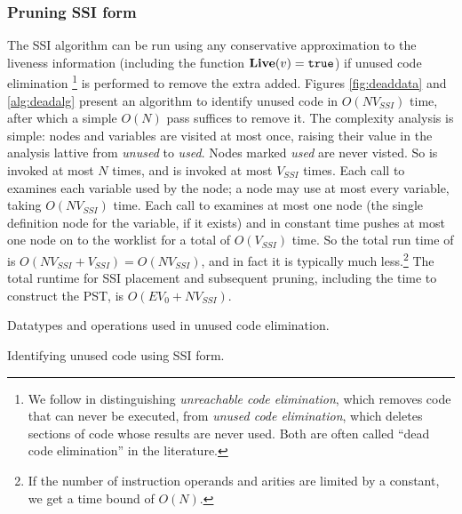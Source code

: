 \documentclass[12pt,titlepage,twoside]{article}
\begin{document}
\subsubsection{Pruning SSI form}\label{sec:unusedcode}
The SSI algorithm can be run using any conservative approximation to
the liveness information
(including the function $\text{\bf Live}(v)=\text{\tt true}$) if
unused code elimination%
\footnote{We follow \cite{wegman91:scc} in distinguishing
\emph{unreachable code elimination}, which removes code that can never
be executed, from \emph{unused code elimination}, which deletes
sections of code whose results are never used.  Both are often called
``dead code elimination'' in the literature.}  is performed to remove
the extra  added.  Figures \ref{fig:deaddata} and
\ref{alg:deadalg} present an algorithm to identify unused code in
$O(N V_{SSI})$ time, after which a simple $O(N)$ pass suffices to remove it.
The complexity analysis is simple: nodes and variables are visited at
most once, raising their value in the analysis lattive from
\emph{unused} to \emph{used}.  Nodes marked \emph{used} are never
visted.  So  is invoked at most $N$ times, and
 is invoked at most $V_{SSI}$ times.  Each call to
 examines each variable used by the node; a
node may use at most every variable, taking $O(N V_{SSI})$ time.  Each call
to  examines at most one node (the single
definition node for the variable, if it exists) and in constant time
pushes at most one node on to the worklist for a total of $O(V_{SSI})$ time.
So the total run time of  is
$O(N V_{SSI}+V_{SSI})=O(N V_{SSI})$, and
in fact it is typically much less.\footnote{If the number of instruction
operands and \phisigfunction{} arities are limited by a
constant, we get a time bound of $O(N)$.}  The total runtime for SSI
placement and subsequent pruning, including the time to construct the
PST, is $O(EV_0 + NV_{SSI})$.

\begin{myfigure}\small

\caption{Datatypes and operations used in unused code elimination.}
\label{fig:deaddata}
\end{myfigure}

\begin{myalgorithm}\small\linespread{0.75}

\caption{Identifying unused code using SSI form.}
\label{alg:deadalg}
\end{myalgorithm}
\end{document}

